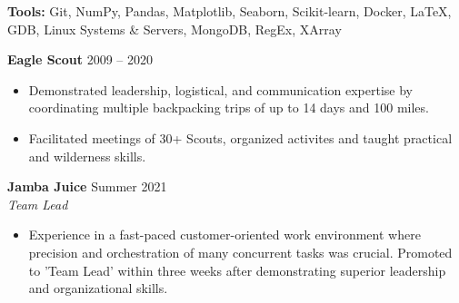 \documentclass{article}
\begin{document}
    \vspace{2mm}

    \noindent \textbf{Tools:} Git, NumPy, Pandas, Matplotlib, Seaborn, Scikit-learn, Docker, \LaTeX, GDB, Linux Systems \& Servers, MongoDB, RegEx, XArray



    
    \noindent \textbf{Eagle Scout} \hfill 2009 -- 2020
    \begin{itemize}
        \item Demonstrated leadership, logistical, and communication expertise by coordinating multiple backpacking trips of up to 14 days and 100 miles.
        \item Facilitated meetings of 30+ Scouts, organized activites and taught practical and wilderness skills.
    \end{itemize}

    \vspace{2mm}

    \noindent \textbf{Jamba Juice} \hfill Summer 2021
    \\ \textit{Team Lead}
    \begin{itemize}
        \item Experience in a fast-paced customer-oriented work environment where precision and orchestration of many concurrent tasks was crucial. Promoted to 'Team Lead' within three weeks after demonstrating superior leadership and organizational skills. 
    \end{itemize}

    
\end{document}
